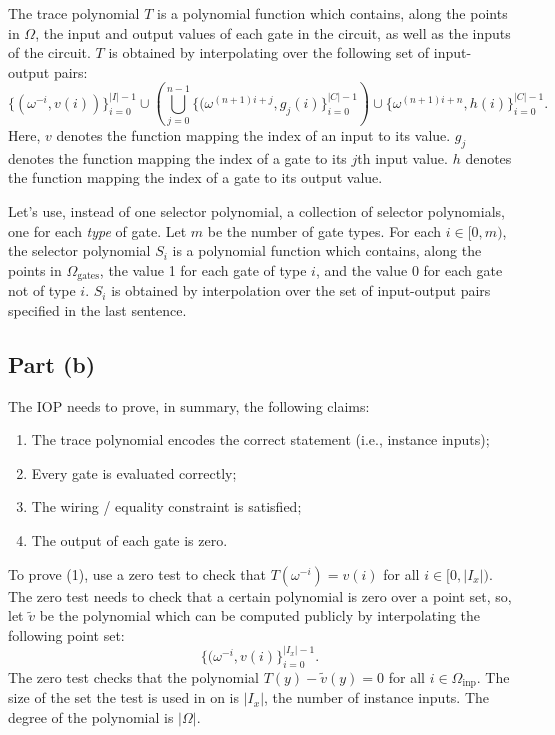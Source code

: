 \documentclass[11pt]{article}
\begin{document}
The trace polynomial $T$ is a polynomial function which contains, along the points in $\Omega$, the input and
output values of each gate in the circuit, as well as the inputs of the circuit. $T$ is obtained by
interpolating over the following set of input-output pairs:
\begin{equation}
	\{(\omega^{-i}, v(i))\}_{i=0}^{|I|-1} \cup \left( \bigcup_{j=0}^{n-1} \{(\omega^{(n+1)i+j}, g_j(i)\}_{i=0}^{|C|-1} \right )
	\cup \{\omega^{(n+1)i+n}, h(i)\}_{i=0}^{|C|-1}.
\end{equation}
Here, $v$ denotes the function mapping the index of an input to its value. $g_j$ denotes the function mapping the
index of a gate to its $j$th input value. $h$ denotes the function mapping the index of a gate to its output value.

Let's use, instead of one selector polynomial, a collection of selector polynomials, one for each \emph{type}\/
of gate. Let $m$ be the number of gate types. For each $i \in [0,m)$, the selector polynomial $S_i$ is a
polynomial function which contains, along the points in $\Omega_{\text{gates}}$, the value 1 for each gate
of type $i$, and the value 0 for each gate not of type $i$. $S_i$ is obtained by interpolation over the
set of input-output pairs specified in the last sentence.

\subsection{Part (b)}

The IOP needs to prove, in summary, the following claims:

\begin{enumerate}
	\item The trace polynomial encodes the correct statement (i.e., instance inputs);
	\item Every gate is evaluated correctly;
	\item The wiring / equality constraint is satisfied;
	\item The output of each gate is zero.
\end{enumerate}

To prove (1), use a zero test to check that $T(\omega^{-i}) = v(i)$ for all $i \in [0,|I_x|)$.
The zero test needs to check that a certain polynomial is zero over a point set, so,
let $\widetilde{v}$ be the polynomial which can be computed publicly by interpolating the
following point set:
\begin{equation}
	\{(\omega^{-i}, v(i)\}_{i=0}^{|I_x|-1}.
\end{equation}
The zero test checks that the polynomial $T(y) - \widetilde{v}(y) = 0$ for all $i \in \Omega_{\text{inp}}$.
The size of the set the test is used in on is $|I_x|$, the number of instance inputs.
The degree of the polynomial is $|\Omega|$.
\end{document}
